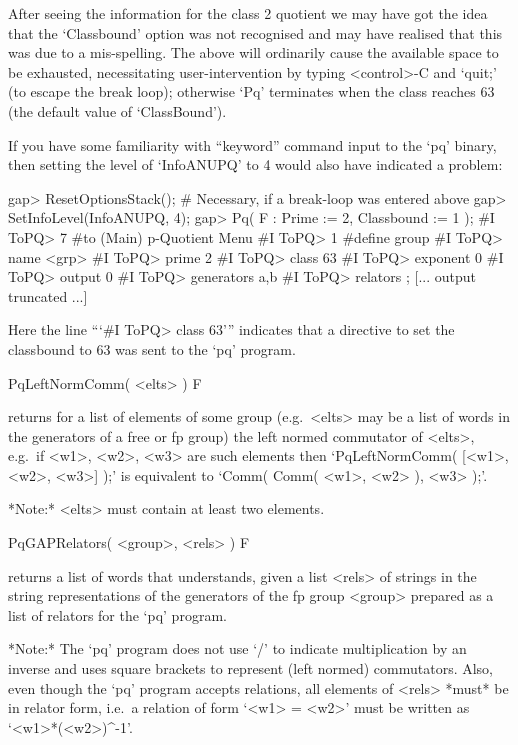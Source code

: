 After seeing the information for the class 2 quotient we may have got the
idea that the  `Classbound'  option  was  not  recognised  and  may  have
realised that this was due to a mis-spelling. The above  will  ordinarily
cause   the   available   space   to    be    exhausted,    necessitating
user-intervention by typing <control>-C and `quit;' (to escape the  break
loop); otherwise `Pq' terminates when the class reaches 63  (the  default
value of `ClassBound').

If you have some familiarity with ``keyword'' command input to  the  `pq'
binary, then setting the level  of  `InfoANUPQ'  to  4  would  also  have
indicated a problem:

\begintt
gap> ResetOptionsStack(); # Necessary, if a break-loop was entered above
gap> SetInfoLevel(InfoANUPQ, 4);
gap> Pq( F : Prime := 2, Classbound := 1 );                  
#I  ToPQ> 7  #to (Main) p-Quotient Menu
#I  ToPQ> 1  #define group
#I  ToPQ> name <grp>
#I  ToPQ> prime 2
#I  ToPQ> class 63
#I  ToPQ> exponent 0
#I  ToPQ> output 0
#I  ToPQ> generators { a,b }
#I  ToPQ> relators   {  };
[... output truncated ...]
\endtt

Here the line ```\#I  ToPQ> class 63''' indicates that a directive to set
the classbound to 63 was sent to the `pq' program.


\>PqLeftNormComm( <elts> ) F

returns for a list of elements of some group (e.g.~<elts> may be  a  list
of words in the generators of  a  free  or  fp  group)  the  left  normed
commutator of <elts>, e.g.~if <w1>, <w2>, <w3>  are  such  elements  then
`PqLeftNormComm( [<w1>, <w2>, <w3>] );' is  equivalent  to  `Comm(  Comm(
<w1>, <w2> ), <w3> );'.

*Note:* <elts> must contain at least two elements.

\>PqGAPRelators( <group>, <rels> ) F

returns a list of words that {\GAP} understands, given a list  <rels>  of
strings in the string representations of the generators of the  fp  group
<group> prepared as a list of relators for the `pq' program.

*Note:*
The `pq' program does not  use  `/'  to  indicate  multiplication  by  an
inverse and uses square brackets to represent (left normed)  commutators.
Also, even though the `pq' program accepts  relations,  all  elements  of
<rels> *must* be in relator form, i.e.~a relation of form `<w1>  =  <w2>'
must be written as `<w1>*(<w2>)^-1'.

